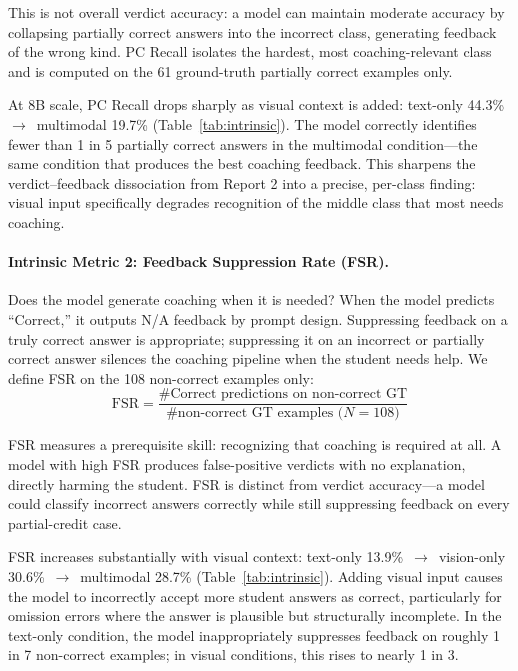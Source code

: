 \documentclass{article}
\begin{document}
This is not overall verdict accuracy: a model can maintain moderate accuracy by
collapsing partially correct answers into the incorrect class, generating feedback
of the wrong kind. PC Recall isolates the hardest, most coaching-relevant class
and is computed on the 61 ground-truth partially correct examples only.

At 8B scale, PC Recall drops sharply as visual context is added: text-only
44.3\%~$\to$~multimodal 19.7\% (Table~\ref{tab:intrinsic}). The model correctly
identifies fewer than 1 in 5 partially correct answers in the multimodal
condition---the same condition that produces the best coaching feedback. This
sharpens the verdict--feedback dissociation from Report 2 into a precise, per-class
finding: visual input specifically degrades recognition of the middle class that
most needs coaching.

\paragraph{Intrinsic Metric 2: Feedback Suppression Rate (FSR).}

Does the model generate coaching when it is needed? When the model predicts
``Correct,'' it outputs N/A feedback by prompt design. Suppressing feedback on
a truly correct answer is appropriate; suppressing it on an incorrect or partially
correct answer silences the coaching pipeline when the student needs help. We define
FSR on the 108 non-correct examples only:
\begin{equation}
\text{FSR} = \frac{\text{\# Correct predictions on non-correct GT}}{\text{\# non-correct GT examples (}N{=}108\text{)}}
\end{equation}

FSR measures a prerequisite skill: recognizing that coaching is required at all.
A model with high FSR produces false-positive verdicts with no explanation,
directly harming the student. FSR is distinct from verdict accuracy---a model
could classify incorrect answers correctly while still suppressing feedback on
every partial-credit case.

FSR increases substantially with visual context: text-only 13.9\%~$\to$~vision-only
30.6\%~$\to$~multimodal 28.7\% (Table~\ref{tab:intrinsic}). Adding visual input
causes the model to incorrectly accept more student answers as correct,
particularly for omission errors where the answer is plausible but structurally
incomplete. In the text-only condition, the model inappropriately suppresses
feedback on roughly 1 in 7 non-correct examples; in visual conditions, this rises
to nearly 1 in 3.
\end{document}

